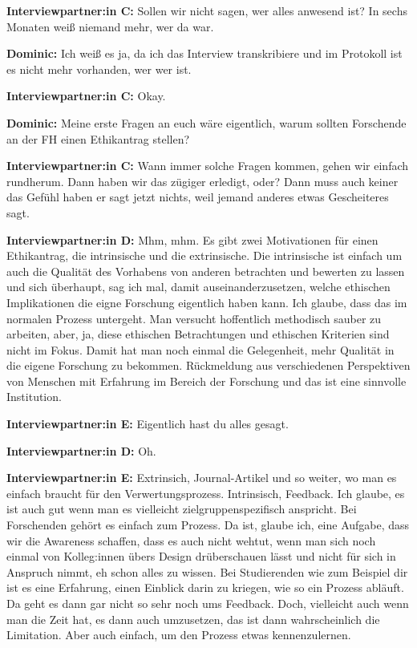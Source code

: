 \documentclass[a4paper,12pt,twoside]{scrreprt}
\begin{document}
\textbf{Interviewpartner:in C:} Sollen wir nicht sagen, wer alles anwesend ist? In sechs Monaten weiß niemand mehr, wer da war.

\textbf{Dominic:} Ich weiß es ja, da ich das Interview transkribiere und im Protokoll ist es nicht mehr vorhanden, wer wer ist.

\textbf{Interviewpartner:in C:} Okay.

\textbf{Dominic:} Meine erste Fragen an euch wäre eigentlich, warum sollten Forschende an der FH einen Ethikantrag stellen?

\textbf{Interviewpartner:in C:} Wann immer solche Fragen kommen, gehen wir einfach rundherum. Dann haben wir das zügiger erledigt, oder? Dann muss auch keiner das Gefühl haben er sagt jetzt nichts, weil jemand anderes etwas Gescheiteres sagt.

\textbf{Interviewpartner:in D:} Mhm, mhm. Es gibt zwei Motivationen für einen Ethikantrag, die intrinsische und die extrinsische. Die intrinsische ist einfach um auch die Qualität des Vorhabens von anderen betrachten und bewerten zu lassen und sich überhaupt, sag ich mal, damit auseinanderzusetzen, welche ethischen Implikationen die eigne Forschung eigentlich haben kann. Ich glaube, dass das im normalen Prozess untergeht. Man versucht hoffentlich methodisch sauber zu arbeiten, aber, ja, diese ethischen Betrachtungen und ethischen Kriterien sind nicht im Fokus. Damit hat man noch einmal die Gelegenheit, mehr Qualität in die eigene Forschung zu bekommen. Rückmeldung aus verschiedenen Perspektiven von Menschen mit Erfahrung im Bereich der Forschung und das ist eine sinnvolle Institution.

\textbf{Interviewpartner:in E:} Eigentlich hast du alles gesagt.

\textbf{Interviewpartner:in D:} Oh.

\textbf{Interviewpartner:in E:} Extrinsich, Journal-Artikel und so weiter, wo man es einfach braucht für den Verwertungsprozess. Intrinsisch, Feedback. Ich glaube, es ist auch gut wenn man es vielleicht zielgruppenspezifisch anspricht. Bei Forschenden gehört es einfach zum Prozess. Da ist, glaube ich, eine Aufgabe, dass wir die Awareness schaffen, dass es auch nicht wehtut, wenn man sich noch einmal von Kolleg:innen übers Design drüberschauen lässt und nicht für sich in Anspruch nimmt, eh schon alles zu wissen. Bei Studierenden wie zum Beispiel dir ist es eine Erfahrung, einen Einblick darin zu kriegen, wie so ein Prozess abläuft. Da geht es dann gar nicht so sehr noch ums Feedback. Doch, vielleicht auch wenn man die Zeit hat, es dann auch umzusetzen, das ist dann wahrscheinlich die Limitation. Aber auch einfach, um den Prozess etwas kennenzulernen.
\end{document}
